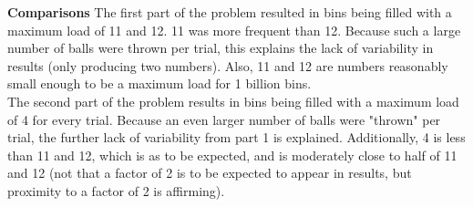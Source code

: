 \documentclass[11pt, solution, letterpaper]{format}
\begin{document}
\textbf{Comparisons}
The first part of the problem resulted in bins being filled with a maximum load of 11 and 12. 11 was more frequent than 12. Because such a large number of balls were thrown per trial, this explains the lack of variability in results (only producing two numbers). Also, 11 and 12 are numbers reasonably small enough to be a maximum load for 1 billion bins. \\

The second part of the problem results in bins being filled with a maximum load of 4 for every trial. Because an even larger number of balls were "thrown" per trial, the further lack of variability from part 1 is explained. Additionally, 4 is less than 11 and 12, which is as to be expected, and is moderately close to half of 11 and 12 (not that a factor of 2 is to be expected to appear in results, but proximity to a factor of 2 is affirming).\\
\end{document}
